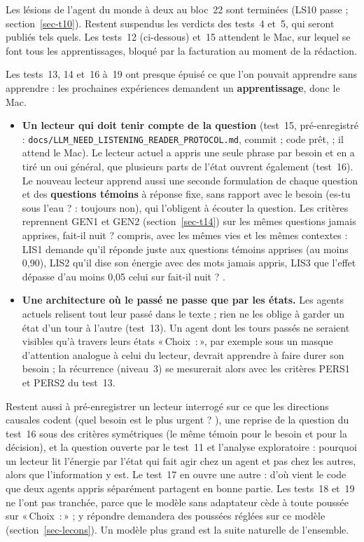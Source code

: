 \documentclass[11pt,a4paper]{article}
\newcommand{\Choix}{«\,Choix~:\,»}
\newcommand{\code}[1]{\texttt{\detokenize{#1}}}
\begin{document}
Les lésions de l'agent du monde à deux au bloc~22 sont terminées (LS10 passe ;
section~\ref{sec-t10}). Restent suspendus les verdicts des tests~4 et~5, qui seront
publiés tels quels. Les tests~12 (ci-dessous) et~15 attendent le Mac, sur lequel se font
tous les apprentissages, bloqué par la facturation au moment de la rédaction.

Les tests~13, 14 et~16 à~19 ont presque épuisé ce que l'on pouvait apprendre sans
apprendre : les prochaines expériences demandent un \textbf{apprentissage}, donc le Mac.
\begin{itemize}
\item \textbf{Un lecteur qui doit tenir compte de la question} (test~15,
pré-enregistré : \texttt{docs/\allowbreak LLM\_NEED\_\allowbreak LISTENING\_\allowbreak READER\_\allowbreak PROTOCOL.md}, commit
\code{a448a03} ; code prêt, \code{decfce0} ; il attend le Mac).
Le lecteur actuel a appris une seule phrase par besoin et en a tiré un \og oui \fg{}
général, que plusieurs parts de l'état ouvrent également (test~16). Le nouveau lecteur apprend aussi une seconde formulation de chaque question et
des \textbf{questions témoins} à réponse fixe, sans rapport avec le besoin (\og es-tu
sous l'eau ? \fg{} : toujours non), qui l'obligent à écouter la question. Les critères
reprennent GEN1 et GEN2 (section~\ref{sec-t14}) sur les mêmes questions jamais apprises,
\og fait-il nuit ? \fg{} compris, avec les mêmes vies et les mêmes contextes : LIS1 demande
qu'il réponde juste aux questions témoins apprises (au moins 0,90), LIS2 qu'il dise son
énergie avec des mots jamais appris, LIS3 que l'effet dépasse d'au moins 0,05 celui sur
\og fait-il nuit ? \fg{}.
\item \textbf{Une architecture où le passé ne passe que par les états.} Les agents
actuels relisent tout leur passé dans le texte ; rien ne les oblige à garder un état
d'un tour à l'autre (test~13). Un agent dont les tours passés ne seraient visibles
qu'à travers leurs états \Choix{}, par exemple sous un masque d'attention analogue à
celui du lecteur, devrait apprendre à faire durer son besoin ; la récurrence
(niveau~3) se mesurerait alors avec les critères PERS1 et PERS2 du test~13.
\end{itemize}
Restent aussi à pré-enregistrer un lecteur interrogé sur ce que les directions
causales codent (\og quel besoin est le plus urgent ? \fg{}), une reprise de la question du
test~16 sous des critères symétriques (le même témoin pour le besoin et pour la décision),
et la question ouverte
par le test~11 et l'analyse exploratoire : pourquoi un lecteur lit l'énergie par
l'état qui fait agir chez un agent et pas chez les autres, alors que l'information y
est. Le test~17 en ouvre une autre : d'où vient le code que deux agents appris
séparément partagent en bonne partie. Les tests~18 et~19 ne l'ont pas tranchée, parce que le
modèle sans adaptateur cède à toute poussée sur \Choix{} ; y répondre demandera des poussées
réglées sur ce modèle (section~\ref{sec-lecons}). Un modèle plus grand est la suite naturelle de
l'ensemble.
\end{document}
